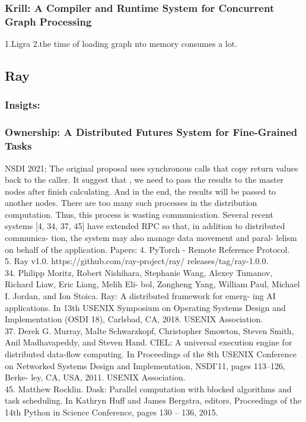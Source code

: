 \documentclass[UTF8]{article}
\begin{document}
\subsubsection{Krill: A Compiler and Runtime System for Concurrent Graph Processing}
1.Ligra 
2.the time of loading graph nto memory consumes a lot. 

\subsection{Ray}
\subsubsection{Insigts:}
\subsubsection{Ownership: A Distributed Futures System for Fine-Grained Tasks~\cite{wang2021ownership}}
NSDI 2021; The original proposal uses synchronous calls that copy return values back to the caller. It suggest that , we need to pass the results to the master nodes after finish calculating. And in the end, the results will be passed to another nodes. There are too many such processes in the distribution computation. Thus, this process is wasting communication. Several recent systems [4, 34, 37, 45] have extended RPC so that, in addition to distributed communica- tion, the system may also manage data movement and paral- lelism on behalf of the application. Papers:
4. PyTorch - Remote Reference Protocol. \\
5. Ray v1.0. https://github.com/ray-project/ray/ releases/tag/ray-1.0.0.\\
34. Philipp Moritz, Robert Nishihara, Stephanie Wang, Alexey Tumanov, Richard Liaw, Eric Liang, Melih Eli- bol, Zongheng Yang, William Paul, Michael I. Jordan, and Ion Stoica. Ray: A distributed framework for emerg- ing AI applications. In 13th USENIX Symposium on Operating Systems Design and Implementation (OSDI 18), Carlsbad, CA, 2018. USENIX Association.\\
37. Derek G. Murray, Malte Schwarzkopf, Christopher Smowton, Steven Smith, Anil Madhavapeddy, and Steven Hand. CIEL: A universal execution engine for distributed data-flow computing. In Proceedings of the 8th USENIX Conference on Networked Systems Design and Implementation, NSDI’11, pages 113–126, Berke- ley, CA, USA, 2011. USENIX Association.\\
45. Matthew Rocklin. Dask: Parallel computation with blocked algorithms and task scheduling. In Kathryn Huff and James Bergstra, editors, Proceedings of the 14th Python in Science Conference, pages 130 – 136, 2015.\\




\end{document}
